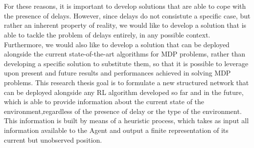     \\\\
    For these reasons, it is important to develop solutions that are able to cope with the presence of delays. However, since delays do not consistute a specific case, but rather an inherent property of reality, we would like to develop a solution that is able to tackle the problem of delays entirely, in any possible context. Furthermore, we would also like to develop a solution that can be deployed alongside the current state-of-the-art algorithms for MDP problems, rather than developing a specific solution to substitute them, so that it is possible to leverage upon present and future results and performances achieved in solving MDP problems. This research thesis goal is to formulate a new structured network that can be deployed alongside any RL algorithm developed so far and in the future, which is able to provide information about the current state of the environment,regardless of the presence of delay or the type of the environment. This information is built by means of a heuristic process, which takes as input all information available to the Agent and output a finite representation of its current but unobserved position.